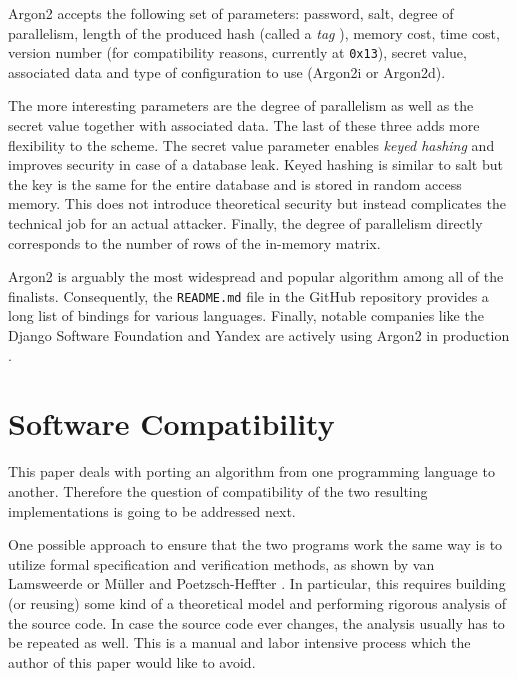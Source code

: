 Argon2 accepts the following set of parameters: password, salt, degree of parallelism, length of the produced hash (called a \emph{tag} \cite{biryukov:2015:argon2}), memory cost, time cost, version number (for compatibility reasons, currently at \texttt{0x13}), secret value, associated data and type of configuration to use (Argon2i or Argon2d).

The more interesting parameters are the degree of parallelism as well as the secret value together with associated data. The last of these three adds more flexibility to the scheme. The secret value parameter enables \emph{keyed hashing} \cite{223865} and improves security in case of a database leak. Keyed hashing is similar to salt but the key is the same for the entire database and is stored in random access memory. This does not introduce theoretical security but instead complicates the technical job for an actual attacker. Finally, the degree of parallelism directly corresponds to the number of rows of the in-memory matrix.

Argon2 is arguably the most widespread and popular algorithm among all of the finalists. Consequently, the \texttt{README.md} file in the GitHub repository \cite{github:2017:argon2} provides a long list of bindings for various languages. Finally, notable companies like the Django Software Foundation and Yandex are actively using Argon2 in production \cite{django:2017:argon2, github:2017:argonische}.

\section{Software Compatibility}
\label{sec:software-compatibility}
\label{sec:unit-testing-fundamentals}

This paper deals with porting an algorithm from one programming language to another. Therefore the question of compatibility of the two resulting implementations is going to be addressed next.

One possible approach to ensure that the two programs work the same way is to utilize formal specification and verification methods, as shown by van Lamsweerde \cite{lamsweerde:2000:formal-specification} or Müller and Poetzsch-Heffter \cite{mueller:1994:formal-specification}. In particular, this requires building (or reusing) some kind of a theoretical model and performing rigorous analysis of the source code. In case the source code ever changes, the analysis usually has to be repeated as well. This is a manual and labor intensive process which the author of this paper would like to avoid.

